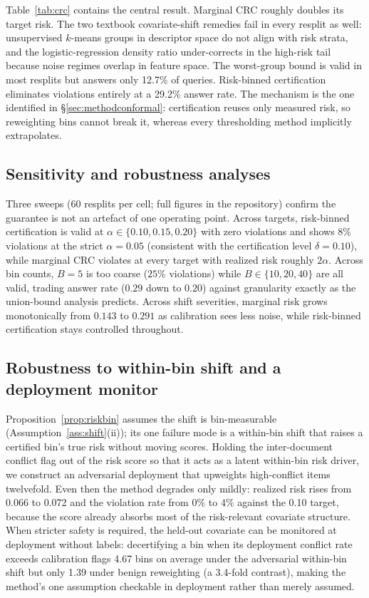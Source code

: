 \documentclass[sn-basic]{sn-jnl}
\theoremstyle{thmstyleone}
\theoremstyle{thmstyletwo}
\begin{document}
Table~\ref{tab:crc} contains the central result. Marginal CRC roughly doubles its target risk. The two textbook
covariate-shift remedies fail in every resplit as well: unsupervised
$k$-means groups in descriptor space do not align with risk strata, and
the logistic-regression density ratio under-corrects in the high-risk
tail because noise regimes overlap in feature space. The worst-group
bound is valid in most resplits but answers only 12.7\% of queries.
Risk-binned certification eliminates violations entirely at a 29.2\%
answer rate. The mechanism is the one identified in
\S\ref{sec:methodconformal}: certification reuses only measured risk,
so reweighting bins cannot break it, whereas every thresholding method
implicitly extrapolates.

\subsection{Sensitivity and robustness analyses}\label{sec:sensitivity}
Three sweeps (60 resplits per cell; full figures in the repository) confirm the
guarantee is not an artefact of one operating point. Across targets, risk-binned
certification is valid at $\alpha \in \{0.10, 0.15, 0.20\}$ with zero violations
and shows $8\%$ violations at the strict $\alpha = 0.05$ (consistent with the
certification level $\delta = 0.10$), while marginal CRC violates at every target
with realized risk roughly $2\alpha$. Across bin counts, $B = 5$ is too coarse
($25\%$ violations) while $B \in \{10, 20, 40\}$ are all valid, trading answer
rate ($0.29$ down to $0.20$) against granularity exactly as the union-bound
analysis predicts. Across shift severities, marginal risk grows monotonically
from $0.143$ to $0.291$ as calibration sees less noise, while risk-binned
certification stays controlled throughout.

\subsection{Robustness to within-bin shift and a deployment monitor}
\label{sec:selfdiag}
Proposition~\ref{prop:riskbin} assumes the shift is bin-measurable
(Assumption~\ref{ass:shift}(ii)); its one failure mode is a within-bin shift
that raises a certified bin's true risk without moving scores. Holding the
inter-document conflict flag out of the risk score so that it acts as a latent
within-bin risk driver, we construct an adversarial deployment that upweights
high-conflict items twelvefold. Even then the method degrades only mildly:
realized risk rises from 0.066 to 0.072 and the violation rate from $0\%$ to
$4\%$ against the 0.10 target, because the score already absorbs most of the
risk-relevant covariate structure. When stricter safety is required, the
held-out covariate can be monitored at deployment without labels: decertifying
a bin when its deployment conflict rate exceeds calibration flags 4.67 bins on
average under the adversarial within-bin shift but only 1.39 under benign
reweighting (a 3.4-fold contrast), making the method's one assumption checkable
in deployment rather than merely assumed.
\end{document}
